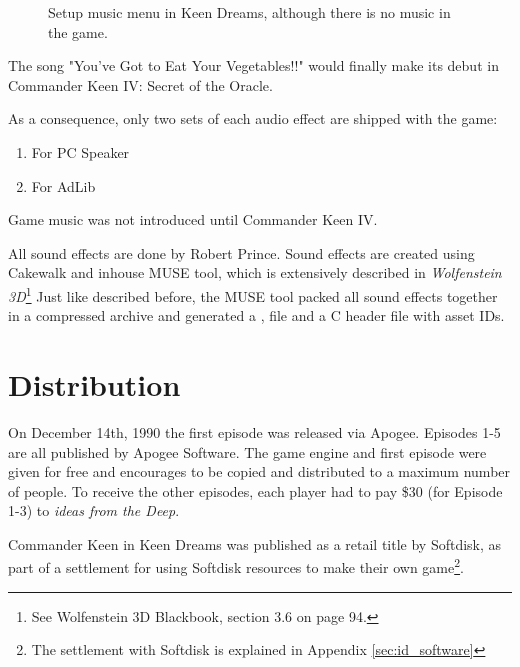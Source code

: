 \documentclass[book.tex]{subfiles}
\begin{document}
\par
\par
\begin{figure}[H]
\centering
{}
\caption{Setup music menu in Keen Dreams, although there is no music in the game.}
\end{figure}
\par

\pagebreak

 The song "You've Got to Eat Your Vegetables!!" would finally make its debut in Commander Keen IV: Secret of the Oracle.\\
\par

As a consequence, only two sets of each audio effect are shipped with the game:
\begin{enumerate}
\item For PC Speaker
\item For AdLib
\end{enumerate}

Game music was not introduced until Commander Keen IV.  \\

\par
All sound effects are done by Robert Prince. Sound effects are created using Cakewalk and inhouse MUSE tool, which is  extensively described in \textit{Wolfenstein 3D}\footnote{See Wolfenstein 3D Blackbook, section 3.6 on page 94.}
Just like described before, the MUSE tool packed all sound effects together in a compressed  archive and generated a ,  file and a C header file with asset IDs.\\




\section{Distribution}
On December 14th, 1990 the first episode was released via Apogee. Episodes 1-5 are all published by Apogee Software. The game engine and first episode were given for free and encourages to be copied and distributed to a maximum number of people. To receive the other episodes, each player had to pay \$30 (for Episode 1-3) to \textit{ideas from the Deep}.\\

\par
Commander Keen in Keen Dreams was published as a retail title by Softdisk, as part of a settlement for using Softdisk resources to make their own game\footnote{The settlement with Softdisk is explained in Appendix \ref{sec:id_software}}.\\
\end{document}
